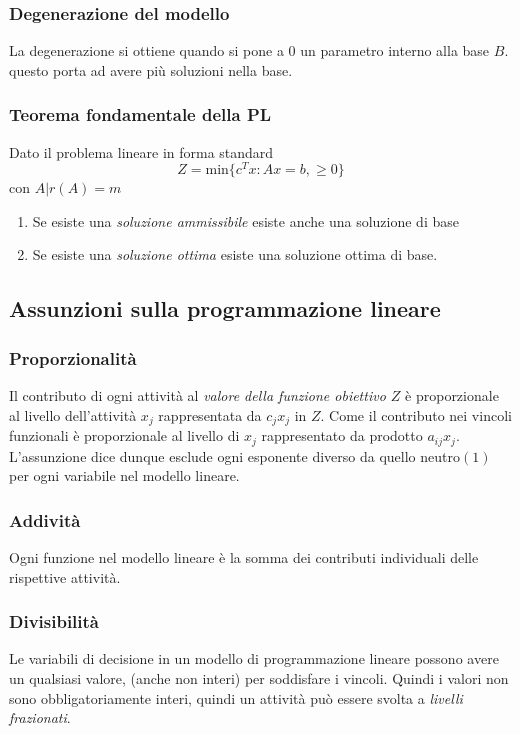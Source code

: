 \documentclass{article}
\begin{document}
\subsubsection{Degenerazione del modello}
La degenerazione si ottiene quando si pone a $0$ un parametro interno alla base $B$. questo porta ad avere più soluzioni nella base.

\subsubsection{\textbf{Teorema fondamentale della PL}}
Dato il problema lineare in forma standard
$$Z=\text{min}\{c^Tx:Ax=b, \ge 0 \}$$
con $A|r(A)=m$
\begin{enumerate}
  \item Se esiste una \textit{soluzione ammissibile} esiste anche una soluzione di base
  \item Se esiste una \textit{soluzione ottima} esiste una soluzione ottima di base.
\end{enumerate}

\subsection{Assunzioni sulla programmazione lineare}

\subsubsection{Proporzionalità}
Il contributo di ogni attività al \textit{valore della funzione obiettivo $Z$} è proporzionale al livello dell'attività $x_j$ rappresentata da $c_jx_j$ in $Z$. Come il contributo nei vincoli funzionali è proporzionale al livello di $x_j$ rappresentato da prodotto $a_{ij}x_j$. L'assunzione dice dunque esclude ogni esponente diverso da quello neutro$(1)$ per ogni variabile nel modello lineare.

\subsubsection{Addività}
Ogni funzione nel modello lineare è la somma dei contributi individuali delle rispettive attività.

\subsubsection{Divisibilità}
Le variabili di decisione in un modello di programmazione lineare possono avere un qualsiasi valore, (anche non interi) per soddisfare i vincoli. Quindi i valori non sono obbligatoriamente interi, quindi un attività può essere svolta a \textit{livelli frazionati}.
\end{document}
